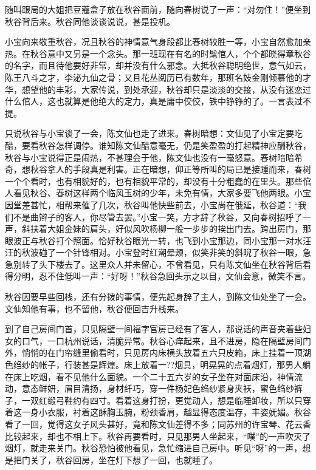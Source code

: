 \documentclass[12pt,UTF8]{ctexbook}
\begin{document}
{{{随叫跟局的大姐把豆蔻盒子放在秋谷面前，随向春树说了一声：“对勿住！”便坐到秋谷背后来。秋谷同他谈谈说说，甚是投机。

小宝向来敬重秋谷，况且秋谷的神情意气身段都比春树较胜一等，小宝自然愈加亲热。在秋谷意中又另是一个念头。那一班现在有名的时髦倌人，个个都晓得章秋谷的名字，而且待他要好非常，却并没有什么邪念。大抵秋谷聪明绝世，意气如云，陈王八斗之才，李泌九仙之骨；又且花丛阅历已有数年，那班名妓金刚倾慕他的才华，想望他的丰彩，大家传说，到处承迎，秋谷却只是淡淡的交接，从没有迷恋过什么倌人，这也就算是他绝大的定力，真是庸中佼佼，铁中铮铮的了。一言表过不提。

只说秋谷与小宝谈了一会，陈文仙也走了进来。春树暗想：文仙见了小宝定要吃醋，要看秋谷怎样调停。谁知陈文仙醋意毫无，仍是笑盈盈的打起精神应酬秋谷，秋谷与小宝说得正是闹热，不甚理会于他，陈文仙也没有一毫怒意。春树暗暗希奇，想秋谷拿人的手段真是利害。正在暗想，仰正等所叫的局已是接踵而来，春树一个个看时，也有相貌好的，也有相貌平常的，却没有十分粗蠢的在里头。那些倌人看见秋谷、春树这样两个临风玉树的少年，未免有情，大家多要飞他两眼。小宝因堂差甚忙，相帮来催了几次，秋谷叫他快些前去，小宝尚在俄延，秋谷道：“我们不是曲辫子的客人，你尽管去罢。”小宝一笑，方才辞了秋谷，又向春树招呼了一声，斜扶着大姐金妹的肩头，好似风吹杨柳一般一步步的挨出门去。跨出房门，那眼波正与秋谷打个照面。恰好秋谷眼光一转，也飞到小宝那边，同小宝那一对水汪汪的秋波碰了一个针锋相对。小宝登时红潮晕颊，似笑非笑的斜睨了秋谷一眼，急急别转了头下楼去了。这里众人并未留心，不曾看见，只有陈文仙坐在秋谷背后看得分明，忍不住低叫一声：“好呀！”秋谷急回头示之以目，文仙会意，微笑不言。

秋谷因要早些回栈，还有分拨的事情，便先起身辞了主人，到陈文仙处坐了一会。文仙知他有事，也不留他，秋谷便回吉升栈来。

到了自己房间门首，只见隔壁一间福字官房已经有了客人，那说话的声音夹着些妇女的口气，一口杭州说话，清脆异常。秋谷心痒起来，且不进房，隐在隔壁房间门外，悄悄的在门帘缝里偷看时，只见房内床横头放着五六只皮箱，床上挂着一顶湖色绉纱的帐子，行装甚是辉煌。床上放着一??烟具，明晃晃的点着烟灯，那男人躺在床上吃烟，看不见他什么面貌。一个二十五六岁的女子坐在对面床沿，神情流动，意态鲜妍，眉目清扬，身材纤巧，穿一件杨妃色绉纱紧身夹袄，蜜色绉纱裤子，一双红缎弓鞋约有四寸。看着这身打扮，更觉动人，想是临睡卸妆，所以只穿着这一身小衣服，衬着这酥胸玉腕，粉颈香肩，越显得态度温存，丰姿妩媚。秋谷看了一回，觉得这女子风头甚好，竟和陈文仙差得不多；同苏州的许宝琴、花云香比较起来，却也不相上下。秋谷再要看时，只见那男人坐起来，“噗”的一声吹灭了烟灯，就走来关门。秋谷恐怕被他看见，急忙缩进自己房中。听见“呀”的一声，想是把门关了，秋谷回房，坐在灯下想了一回，也就睡了。

}}}
\end{document}
